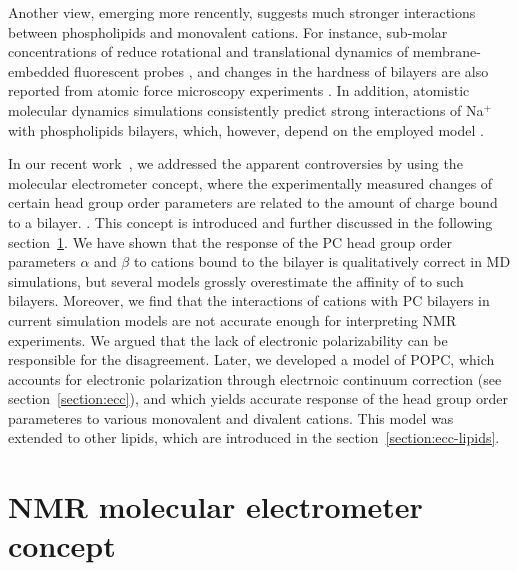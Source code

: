 Another view, emerging more rencently, suggests much stronger interactions between phospholipids and monovalent cations. 
For instance, sub-molar concentrations of  reduce rotational and translational dynamics of membrane-embedded fluorescent probes \citep{bockmann03,vacha09a,harb13}, 
and changes in the hardness of bilayers are also reported from atomic force microscopy experiments \citep{manyes05,manyes06,fukuma07,ferber11,morata12}.
In addition, atomistic molecular dynamics simulations consistently predict strong interactions of Na${^+}$ with phospholipids bilayers,
which, however, depend on the employed model \citep{bockmann03,bockmann04,sachs04,berkowitz06,cordomi08,cordomi09,valley11,berkowitz12}.

In our recent work~\citep{catte16}, we addressed the apparent controversies 
by using the molecular electrometer concept, 
where the experimentally measured changes of certain head group order parameters 
are related to the amount of charge bound to a bilayer. \citep{brown77,akutsu81,altenbach84,seelig87,scherer89}.
This concept is introduced and further discussed in the following section~\ref{section:electrometer}. 
We have shown that the response of the PC head group order parameters $\alpha$ and $\beta$ 
to cations bound to the bilayer is qualitatively correct in MD simulations, 
but several models grossly overestimate the affinity of  to such bilayers. 
Moreover, we find that the interactions of  cations with PC bilayers
in current simulation models are not accurate enough for interpreting NMR experiments. 
We argued that the lack of electronic polarizability can be responsible for the disagreement. 
Later, we developed a model of POPC, 
which accounts for electronic polarization through electrnoic continuum correction (see section~\ref{section:ecc}), 
and which yields accurate response of the head group order parameteres to various monovalent and divalent cations. \citep{melcr18}
This model was extended to other lipids, which are introduced in the section~\ref{section:ecc-lipids}. 









\section{NMR molecular electrometer concept} \label{section:electrometer} 

